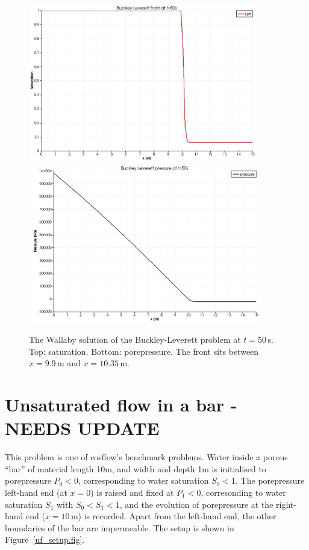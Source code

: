 \documentclass[]{scrreprt}
\begin{document}
\begin{figure}[htb]
\begin{center}
\includegraphics[width=10cm]{bl_seff.eps} \\
$\mbox{}$
\includegraphics[width=10cm]{bl_p.eps} \\
\caption{The Wallaby solution of the Buckley-Leverett problem at
  $t=50$\,s.  Top: saturation.  Bottom: porepressure.  The front sits
  between $x=9.9$\,m and $x=10.35$\,m.}
\label{satfront.figa}
\end{center}
\end{figure}


\chapter{Unsaturated flow in a bar - NEEDS UPDATE}

This problem is one of cosflow's benchmark problems.  Water inside a
porous ``bar'' of material length 10m, and width and depth 1m is
initialised to porepressure $P_{0}<0$, corresponding to water
saturation $S_{0}<1$.  The porepressure left-hand end (at $x=0$) is
raised and fixed at $P_{1}<0$, corresonding to water saturation
$S_{1}$ with $S_{0}<S_{1}<1$, and the evolution of porepressure at the
right-hand end ($x=10$\,m) is recorded.  Apart from the left-hand end,
the other boundaries of the bar are impermeable.  The setup is shown in
Figure~\ref{uf_setup.fig}.
\end{document}
